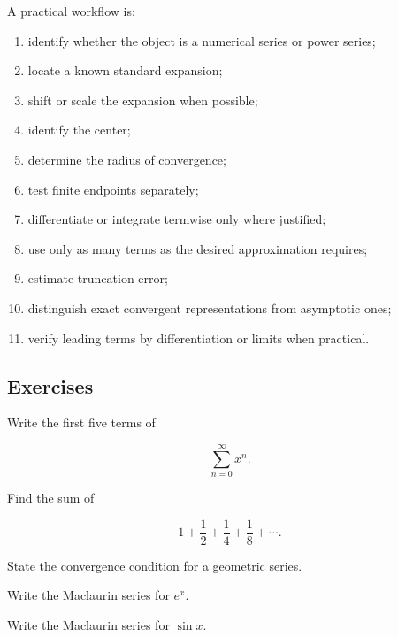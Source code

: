 A practical workflow is:

\begin{enumerate}
    \item identify whether the object is a numerical series or power series;
    \item locate a known standard expansion;
    \item shift or scale the expansion when possible;
    \item identify the center;
    \item determine the radius of convergence;
    \item test finite endpoints separately;
    \item differentiate or integrate termwise only where justified;
    \item use only as many terms as the desired approximation requires;
    \item estimate truncation error;
    \item distinguish exact convergent representations from asymptotic ones;
    \item verify leading terms by differentiation or limits when practical.
\end{enumerate}

\subsection{Exercises}
\label{subsec:series-expansions-exercises}

\begin{exercise}[1]
Write the first five terms of

\[
\sum_{n=0}^{\infty}x^n.
\]
\end{exercise}

\begin{exercise}[1]
Find the sum of

\[
1+\frac12+\frac14+\frac18+\cdots.
\]
\end{exercise}

\begin{exercise}[1]
State the convergence condition for a geometric series.
\end{exercise}

\begin{exercise}[1]
Write the Maclaurin series for \(e^x\).
\end{exercise}

\begin{exercise}[1]
Write the Maclaurin series for \(\sin x\).
\end{exercise}

